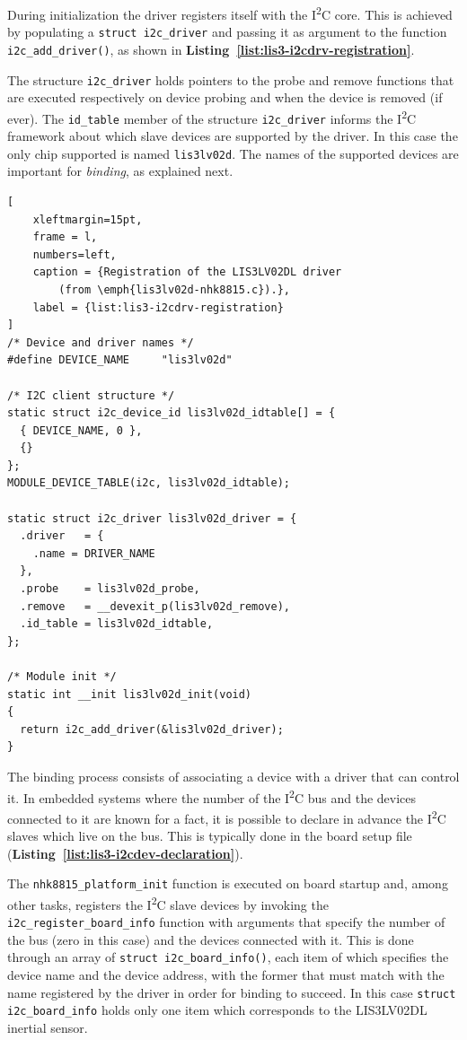 \documentclass[a4paper,10pt]{article}
\newcommand{\iic}{I\textsuperscript{2}C }
\newcommand{\keyword}[1]{\texttt{#1}}
\newcommand{\refl}[1]{\textbf{Listing~\ref{#1}}}
\begin{document}
\begin{multicols}{2}
During initialization the driver registers itself with the \iic core. This
is achieved by populating a \keyword{struct i2c\_driver} and passing it
as argument to the function \keyword{i2c\_add\_driver()}, as shown in
\refl{list:lis3-i2cdrv-registration}.

The structure \keyword{i2c\_driver} holds pointers to the probe and remove
functions that are executed respectively on device probing and when the device
is removed (if ever).
The \keyword{id\_table} member of the structure \keyword{i2c\_driver} informs
the \iic framework about which slave devices are supported by the driver.
In this case the only chip supported is named \keyword{lis3lv02d}.
The names of the supported devices are important for \emph{binding}, as
explained next.
\begin{lstlisting}[
	xleftmargin=15pt,
	frame = l,
	numbers=left,
	caption = {Registration of the LIS3LV02DL driver
		(from \emph{lis3lv02d-nhk8815.c}).},
	label = {list:lis3-i2cdrv-registration}
]
/* Device and driver names */
#define	DEVICE_NAME		"lis3lv02d"

/* I2C client structure */
static struct i2c_device_id lis3lv02d_idtable[] = {
  { DEVICE_NAME, 0 },
  {}
};
MODULE_DEVICE_TABLE(i2c, lis3lv02d_idtable);

static struct i2c_driver lis3lv02d_driver = {
  .driver   = {
    .name = DRIVER_NAME
  },
  .probe    = lis3lv02d_probe,
  .remove   = __devexit_p(lis3lv02d_remove),
  .id_table = lis3lv02d_idtable,
};

/* Module init */
static int __init lis3lv02d_init(void)
{
  return i2c_add_driver(&lis3lv02d_driver);
}
\end{lstlisting}

The binding process consists of associating a device with a driver that can
control it. In embedded systems where the number of the \iic bus and the
devices connected to it are known for a fact, it is possible to declare in
advance the \iic slaves which live on the bus. This is typically done in the
board setup file (\refl{list:lis3-i2cdev-declaration}).

The \keyword{nhk8815\_platform\_init} function is executed on board startup
and, among other tasks, registers the \iic slave devices by invoking the
\keyword{i2c\_register\_board\_info} function with arguments that specify
the number of the bus (zero in this case) and the devices connected with it.
This is done through an array of \keyword{struct i2c\_board\_info()}, each item
of which specifies the device name and the device address, with the former that
must match with the name registered by the driver in order for binding to succeed.
In this case \keyword{struct i2c\_board\_info} holds only one item which
corresponds to the LIS3LV02DL inertial sensor.


\end{multicols}
\end{document}
